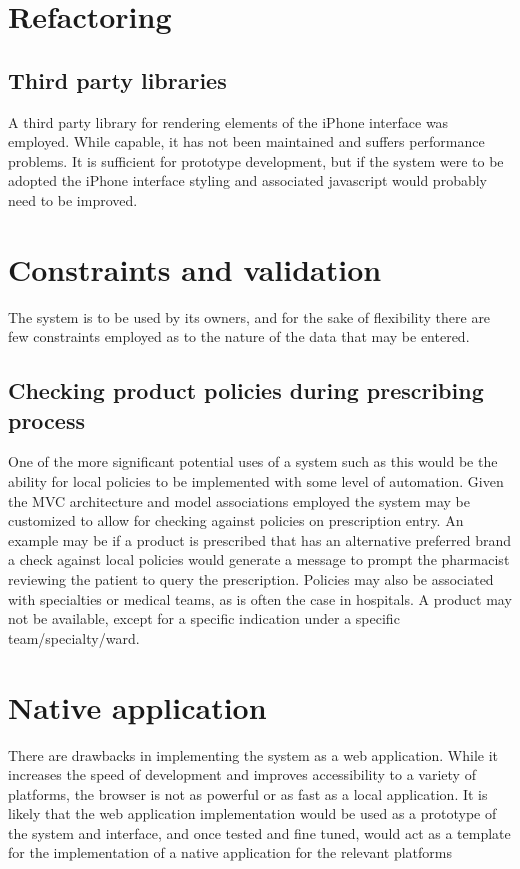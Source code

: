 \documentclass[letterpaper]{amsart}
\begin{document}
\section{Refactoring}
\subsection{Third party libraries}
A third party library for rendering elements of the iPhone interface was employed.  While capable, it has not been maintained and suffers performance problems.  It is sufficient for prototype development, but if the system were to be adopted the iPhone interface styling and associated javascript would probably need to be improved.
\section{Constraints and validation}
The system is to be used by its owners, and for the sake of flexibility there are few constraints employed as to the nature of the data that may be entered.  
\subsection{Checking product policies during prescribing process}
One of the more significant potential uses of a system such as this would be the ability for local policies to be implemented with some level of automation.  Given the MVC architecture and model associations employed the system may be customized to allow for checking against policies on prescription entry.  An example may be if a product is prescribed that has an alternative preferred brand a check against local policies would generate a message to prompt the pharmacist reviewing the patient to query the prescription.  Policies may also be associated with specialties or medical teams, as is often the case in hospitals.  A product may not be available, except for a specific indication under a specific team/specialty/ward.
\section{Native application}
There are drawbacks in implementing the system as a web application.  While it increases the speed of development and improves accessibility to a variety of platforms, the browser is not as powerful or as fast as a local application.  It is likely that the web application implementation would be used as a prototype of the system and interface, and once tested and fine tuned, would act as a template for the implementation of a native application for the relevant platforms
\end{document}
